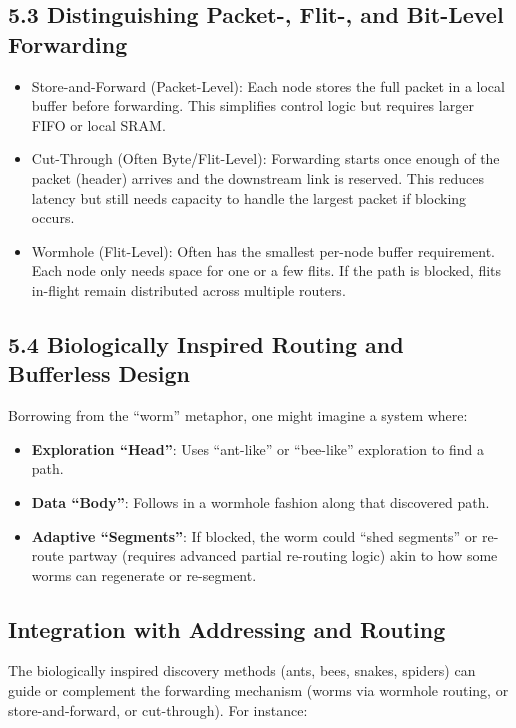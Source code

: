 \documentclass[../OAE-SPEC-MAIN.tex]{subfiles}
\begin{document}
\subsection{5.3 Distinguishing Packet-, Flit-, and Bit-Level Forwarding}

\begin{itemize}
	\item Store-and-Forward (Packet-Level): Each node stores the full packet in a local buffer before forwarding. This simplifies control logic but requires larger FIFO or local SRAM.
	\item Cut-Through (Often Byte/Flit-Level): Forwarding starts once enough of the packet (header) arrives and the downstream link is reserved. This reduces latency but still needs capacity to handle the largest packet if blocking occurs.
	\item Wormhole (Flit-Level): Often has the smallest per-node buffer requirement. Each node only needs space for one or a few flits. If the path is blocked, flits in-flight remain distributed across multiple routers.
\end{itemize}

\subsection{5.4 Biologically Inspired Routing and Bufferless Design}

Borrowing from the “worm” metaphor, one might imagine a system where:
\begin{itemize}
    \item \textbf{Exploration “Head”}: Uses “ant-like” or “bee-like” exploration to find a path.
    \item \textbf{Data “Body”}: Follows in a wormhole fashion along that discovered path.
    \item \textbf{Adaptive “Segments”}: If blocked, the worm could “shed segments” or re-route partway (requires advanced partial re-routing logic) akin to how some worms can regenerate or re-segment.
\end{itemize}

\subsection*{Integration with Addressing and Routing}

The biologically inspired discovery methods (ants, bees, snakes, spiders) can guide or complement the forwarding mechanism (worms via wormhole routing, or store-and-forward, or cut-through). For instance:
\end{document}
